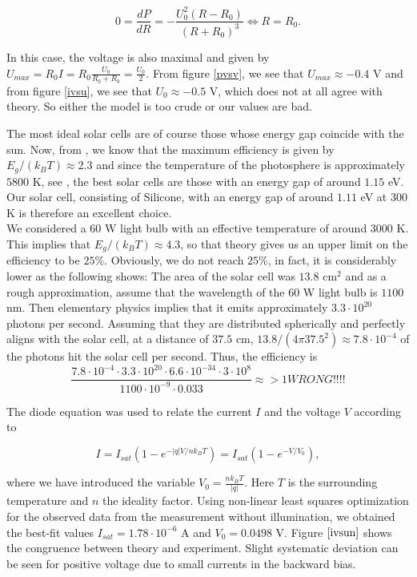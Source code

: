 \documentclass[12pt,a4paper]{article}
\begin{document}
\begin{displaymath}
  0=\frac{dP}{dR}=-\frac{U_0^2(R-R_0)}{(R+R_0)^3}\iff R=R_0.
\end{displaymath}

In this case, the voltage is also maximal and given by $U_{max}=R_0I=R_0\frac{U_0}{R_0+R_0}=\frac{U_0}{2}$.
From figure \ref{pvsv}, we see that $U_{max}\approx -0.4$ V and from figure \ref{ivsu}, we see that $U_0\approx -0.5$ V, which does not at all agree with theory. So either the model is too crude or our values are bad.

The most ideal solar cells are of course those whose energy gap coincide with the sun. Now, from \cite{lab_PM}, we know that the maximum efficiency is given by $E_g/(k_BT)\approx 2.3$ and since the temperature of the photosphere is approximately $5800$ K, see \cite{sun}, the best solar cells are those with an energy gap of around $1.15$ eV.
Our solar cell, consisting of Silicone, with an energy gap of around $1.11$ eV at $300$ K is therefore an excellent choice. \\

We considered a $60$ W light bulb with an effective temperature of around $3000$ K. This implies that $E_g/(k_B T)\approx 4.3$, so that theory gives us an upper limit on the efficiency to be $25$\%.
Obviously, we do not reach $25$\%, in fact, it is considerably lower as the following shows:
The area of the solar cell was $13.8$ cm${}^2$ and as a rough approximation, assume that the wavelength of the $60$ W light bulb is $1100$ nm. Then elementary physics implies that it emits approximately $3.3\cdot 10^{20}$ photons per second. Assuming that they are distributed spherically and perfectly aligns with the solar cell, at a distance of $37.5$ cm, $13.8/(4\pi 37.5^2)\approx 7.8\cdot 10^{-4}$ of the photons hit the solar cell per second.
Thus, the efficiency is 
\begin{displaymath}
  \frac{7.8\cdot 10^{-4}\cdot 3.3\cdot 10^{20}\cdot 6.6\cdot 10^{-34}\cdot 3\cdot 10^8}{1100\cdot 10^{-9}\cdot 0.033 }\approx >1 WRONG!!!!
\end{displaymath}

The diode equation was used to relate the current $I$ and the voltage $V$ according to

$$I = I_{sat}\left(1-e^{-|q|V/nk_BT}\right) = I_{sat}\left(1-e^{-V/V_0}\right),$$

where we have introduced the variable $V_0 = \frac{nk_BT}{|q|}$. Here $T$ is the surrounding temperature and $n$ the ideality factor. Using non-linear least squares optimization for the observed data from the measurement without illumination, we obtained the best-fit values $I_{sat}=1.78\cdot 10^{-6}$ A and $V_0=0.0498$ V. Figure $\ref{ivsun}$ shows the congruence between theory and experiment. Slight systematic deviation can be seen for positive voltage due to small currents in the backward bias. \\
\end{document}
